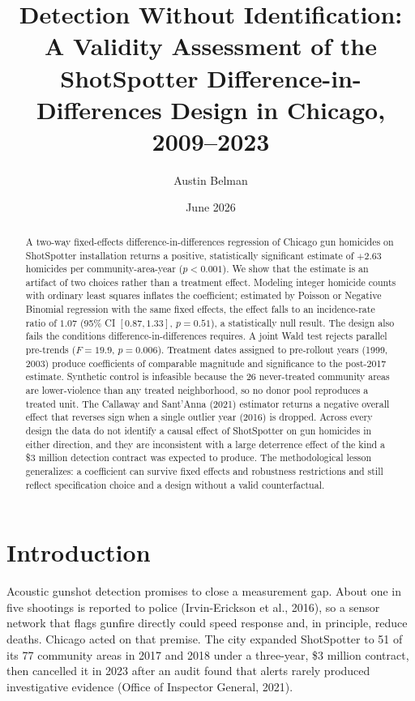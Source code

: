 \documentclass[12pt]{article}
\title{\vspace{-1.5em}\textbf{Detection Without Identification: A Validity Assessment of the
ShotSpotter Difference-in-Differences Design in Chicago, 2009--2023}}
\author{Austin Belman}
\date{June 2026}
\begin{document}
\maketitle
\thispagestyle{empty}

\begin{abstract}
\noindent
A two-way fixed-effects difference-in-differences regression of Chicago gun homicides on
ShotSpotter installation returns a positive, statistically significant estimate of
$+2.63$ homicides per community-area-year ($p < 0.001$). We show that the estimate is an
artifact of two choices rather than a treatment effect. Modeling integer homicide counts
with ordinary least squares inflates the coefficient; estimated by Poisson or Negative
Binomial regression with the same fixed effects, the effect falls to an incidence-rate
ratio of $1.07$ (95\% CI $[0.87, 1.33]$, $p = 0.51$), a statistically null result. The
design also fails the conditions difference-in-differences requires. A joint Wald test
rejects parallel pre-trends ($F = 19.9$, $p = 0.006$). Treatment dates assigned to
pre-rollout years (1999, 2003) produce coefficients of comparable magnitude and
significance to the post-2017 estimate. Synthetic control is infeasible because the 26
never-treated community areas are lower-violence than any treated neighborhood, so no
donor pool reproduces a treated unit. The Callaway and Sant'Anna (2021) estimator returns
a negative overall effect that reverses sign when a single outlier year (2016) is
dropped. Across every design the data do not identify a causal effect of ShotSpotter on
gun homicides in either direction, and they are inconsistent with a large deterrence
effect of the kind a \$3 million detection contract was expected to produce. The methodological lesson
generalizes: a coefficient can survive fixed effects and robustness restrictions and
still reflect specification choice and a design without a valid counterfactual.
\end{abstract}

\section{Introduction}

Acoustic gunshot detection promises to close a measurement gap. About one in five
shootings is reported to police (Irvin-Erickson et al., 2016), so a sensor network that
flags gunfire directly could speed response and, in principle, reduce deaths. Chicago
acted on that premise. The city expanded ShotSpotter to 51 of its 77 community areas in
2017 and 2018 under a three-year, \$3 million contract, then cancelled it in 2023 after an
audit found that alerts rarely produced investigative evidence (Office of Inspector
General, 2021).
\end{document}
